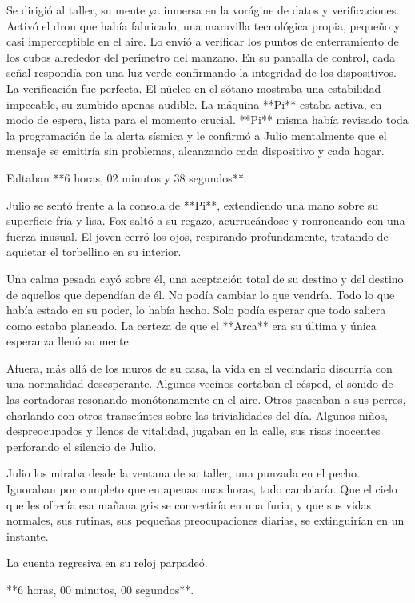 \documentclass[a4paper,12pt]{book}
\begin{document}
Se dirigió al taller, su mente ya inmersa en la vorágine de datos y verificaciones. Activó el dron que había fabricado, una maravilla tecnológica propia, pequeño y casi imperceptible en el aire. Lo envió a verificar los puntos de enterramiento de los cubos alrededor del perímetro del manzano. En su pantalla de control, cada señal respondía con una luz verde confirmando la integridad de los dispositivos. La verificación fue perfecta. El núcleo en el sótano mostraba una estabilidad impecable, su zumbido apenas audible. La máquina **Pi** estaba activa, en modo de espera, lista para el momento crucial. **Pi** misma había revisado toda la programación de la alerta sísmica y le confirmó a Julio mentalmente que el mensaje se emitiría sin problemas, alcanzando cada dispositivo y cada hogar.

Faltaban **6 horas, 02 minutos y 38 segundos**.

Julio se sentó frente a la consola de **Pi**, extendiendo una mano sobre su superficie fría y lisa. Fox saltó a su regazo, acurrucándose y ronroneando con una fuerza inusual. El joven cerró los ojos, respirando profundamente, tratando de aquietar el torbellino en su interior.

Una calma pesada cayó sobre él, una aceptación total de su destino y del destino de aquellos que dependían de él. No podía cambiar lo que vendría. Todo lo que había estado en su poder, lo había hecho. Solo podía esperar que todo saliera como estaba planeado. La certeza de que el **Arca** era su última y única esperanza llenó su mente.

Afuera, más allá de los muros de su casa, la vida en el vecindario discurría con una normalidad desesperante. Algunos vecinos cortaban el césped, el sonido de las cortadoras resonando monótonamente en el aire. Otros paseaban a sus perros, charlando con otros transeúntes sobre las trivialidades del día. Algunos niños, despreocupados y llenos de vitalidad, jugaban en la calle, sus risas inocentes perforando el silencio de Julio.

Julio los miraba desde la ventana de su taller, una punzada en el pecho. Ignoraban por completo que en apenas unas horas, todo cambiaría. Que el cielo que les ofrecía esa mañana gris se convertiría en una furia, y que sus vidas normales, sus rutinas, sus pequeñas preocupaciones diarias, se extinguirían en un instante.

La cuenta regresiva en su reloj parpadeó.

**6 horas, 00 minutos, 00 segundos**.
\end{document}
